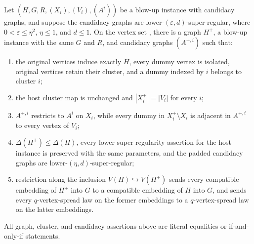 \begin{lemma}
Let $(H,G,R,(X_i),(V_i),(A^i))$ be a blow-up instance with candidacy graphs, and suppose the candidacy graphs are lower-$(\varepsilon,d)$-super-regular, where $0<\varepsilon\leq\eta^2$, $\eta\leq1$, and $d\leq1$.  On the vertex set , there is a graph $H^+$, a blow-up instance with the same $G$ and $R$, and candidacy graphs $(A^{+,i})$ such that:
\begin{enumerate}
\item the original vertices induce exactly $H$, every dummy vertex is isolated, original vertices retain their cluster, and a dummy indexed by $i$ belongs to cluster $i$;
\item the host cluster map is unchanged and $|X_i^+|=|V_i|$ for every $i$;
\item $A^{+,i}$ restricts to $A^i$ on $X_i$, while every dummy in $X_i^+\setminus X_i$ is adjacent in $A^{+,i}$ to every vertex of $V_i$;
\item $\Delta(H^+)\leq\Delta(H)$, every lower-super-regularity assertion for the host instance is preserved with the same parameters, and the padded candidacy graphs are lower-$(\eta,d)$-super-regular;
\item restriction along the inclusion $V(H)\hookrightarrow V(H^+)$ sends every compatible embedding of $H^+$ into $G$ to a compatible embedding of $H$ into $G$, and sends every $q$-vertex-spread law on the former embeddings to a $q$-vertex-spread law on the latter embeddings.
\end{enumerate}
All graph, cluster, and candidacy assertions above are literal equalities or if-and-only-if statements.
\end{lemma}
